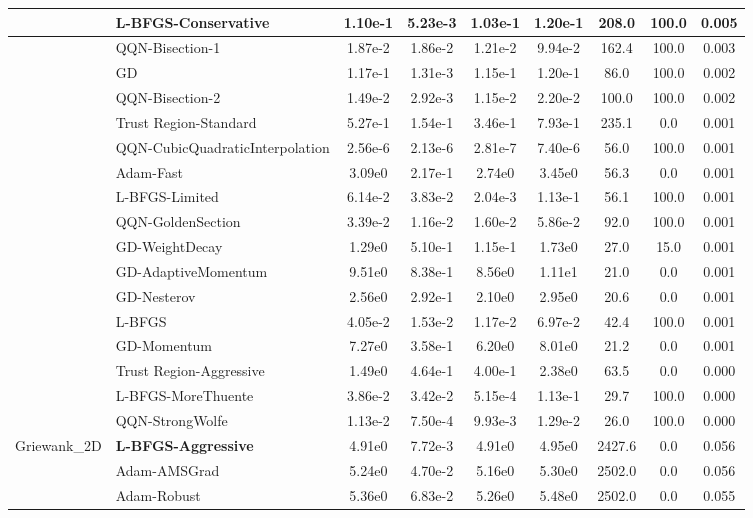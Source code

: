 \documentclass[10pt]{article}
\begin{document}
\begin{longtable}{|l|l|c|c|c|c|c|c|c|}
 & L-BFGS-Conservative & 1.10e-1 & 5.23e-3 & 1.03e-1 & 1.20e-1 & 208.0 & 100.0 & 0.005 \\
\hline
 & QQN-Bisection-1 & 1.87e-2 & 1.86e-2 & 1.21e-2 & 9.94e-2 & 162.4 & 100.0 & 0.003 \\
\hline
 & GD & 1.17e-1 & 1.31e-3 & 1.15e-1 & 1.20e-1 & 86.0 & 100.0 & 0.002 \\
\hline
 & QQN-Bisection-2 & 1.49e-2 & 2.92e-3 & 1.15e-2 & 2.20e-2 & 100.0 & 100.0 & 0.002 \\
\hline
 & Trust Region-Standard & 5.27e-1 & 1.54e-1 & 3.46e-1 & 7.93e-1 & 235.1 & 0.0 & 0.001 \\
\hline
 & QQN-CubicQuadraticInterpolation & 2.56e-6 & 2.13e-6 & 2.81e-7 & 7.40e-6 & 56.0 & 100.0 & 0.001 \\
\hline
 & Adam-Fast & 3.09e0 & 2.17e-1 & 2.74e0 & 3.45e0 & 56.3 & 0.0 & 0.001 \\
\hline
 & L-BFGS-Limited & 6.14e-2 & 3.83e-2 & 2.04e-3 & 1.13e-1 & 56.1 & 100.0 & 0.001 \\
\hline
 & QQN-GoldenSection & 3.39e-2 & 1.16e-2 & 1.60e-2 & 5.86e-2 & 92.0 & 100.0 & 0.001 \\
\hline
 & GD-WeightDecay & 1.29e0 & 5.10e-1 & 1.15e-1 & 1.73e0 & 27.0 & 15.0 & 0.001 \\
\hline
 & GD-AdaptiveMomentum & 9.51e0 & 8.38e-1 & 8.56e0 & 1.11e1 & 21.0 & 0.0 & 0.001 \\
\hline
 & GD-Nesterov & 2.56e0 & 2.92e-1 & 2.10e0 & 2.95e0 & 20.6 & 0.0 & 0.001 \\
\hline
 & L-BFGS & 4.05e-2 & 1.53e-2 & 1.17e-2 & 6.97e-2 & 42.4 & 100.0 & 0.001 \\
\hline
 & GD-Momentum & 7.27e0 & 3.58e-1 & 6.20e0 & 8.01e0 & 21.2 & 0.0 & 0.001 \\
\hline
 & Trust Region-Aggressive & 1.49e0 & 4.64e-1 & 4.00e-1 & 2.38e0 & 63.5 & 0.0 & 0.000 \\
\hline
 & L-BFGS-MoreThuente & 3.86e-2 & 3.42e-2 & 5.15e-4 & 1.13e-1 & 29.7 & 100.0 & 0.000 \\
\hline
 & QQN-StrongWolfe & 1.13e-2 & 7.50e-4 & 9.93e-3 & 1.29e-2 & 26.0 & 100.0 & 0.000 \\
Griewank\_2D & \textbf{L-BFGS-Aggressive} & 4.91e0 & 7.72e-3 & 4.91e0 & 4.95e0 & 2427.6 & 0.0 & 0.056 \\
\hline
 & Adam-AMSGrad & 5.24e0 & 4.70e-2 & 5.16e0 & 5.30e0 & 2502.0 & 0.0 & 0.056 \\
\hline
 & Adam-Robust & 5.36e0 & 6.83e-2 & 5.26e0 & 5.48e0 & 2502.0 & 0.0 & 0.055 \\

\end{longtable}
\end{document}
